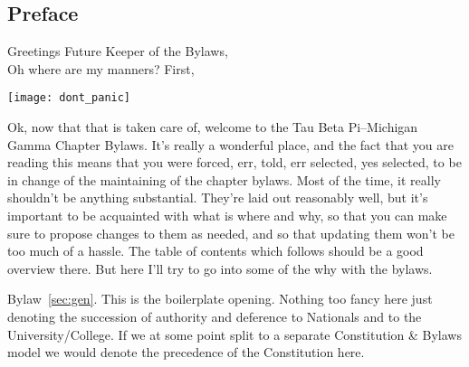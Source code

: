 \begin{preface}
\chapter*{Preface}
Greetings Future Keeper of the Bylaws,\\
Oh where are my manners? First,
\begin{center}
\texttt{[image: dont\_panic]}
\end{center}
Ok, now that that is taken care of, welcome to the Tau Beta Pi--Michigan Gamma Chapter Bylaws. It's really a wonderful place, and the fact that you are reading this means that you were forced, err, told, err selected, yes selected, to be in change of the maintaining of the chapter bylaws. Most of the time, it really shouldn't be anything substantial. They're laid out reasonably well, but it's important to be acquainted with what is where and why, so that you can make sure to propose changes to them as needed, and so that updating them won't be too much of a hassle. The table of contents which follows should be a good overview there. But here I'll try to go into some of the why with the bylaws.

Bylaw~\ref{sec:gen}. This is the boilerplate opening. Nothing too fancy here just denoting the succession of authority and deference to Nationals and to the University/College. If we at some point split to a separate Constitution \& Bylaws model we would denote the precedence of the Constitution here.


\end{preface}
